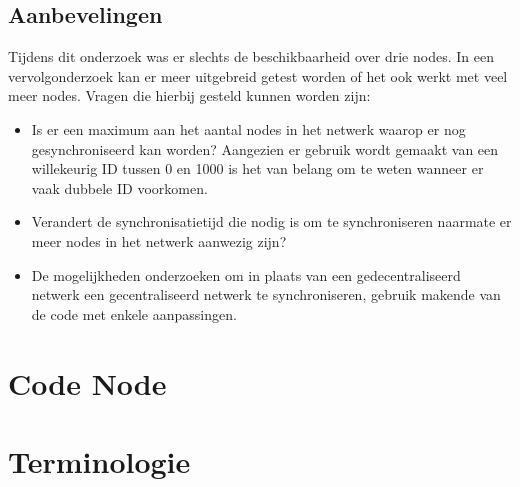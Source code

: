 \documentclass{article}
\begin{document}
\subsection{Aanbevelingen}
Tijdens dit onderzoek was er slechts de beschikbaarheid over drie nodes. In een vervolgonderzoek kan er meer uitgebreid getest worden of het ook werkt met veel meer nodes. Vragen die hierbij gesteld kunnen worden zijn:
\begin{itemize}
	\item Is er een maximum aan het aantal nodes in het netwerk waarop er nog gesynchroniseerd kan worden? Aangezien er gebruik wordt gemaakt van een willekeurig ID tussen 0 en 1000 is het van belang om te weten wanneer er vaak dubbele ID voorkomen. 
	\item Verandert de synchronisatietijd die nodig is om te synchroniseren naarmate er meer nodes in het netwerk aanwezig zijn?
	\item De mogelijkheden onderzoeken om in plaats van een gedecentraliseerd netwerk een gecentraliseerd netwerk te synchroniseren, gebruik makende van de code met enkele aanpassingen. 
\end{itemize}
\newpage





\clearpage
\appendix
{}
\section{Code Node}

\newpage

\section{Terminologie}
\end{document}
